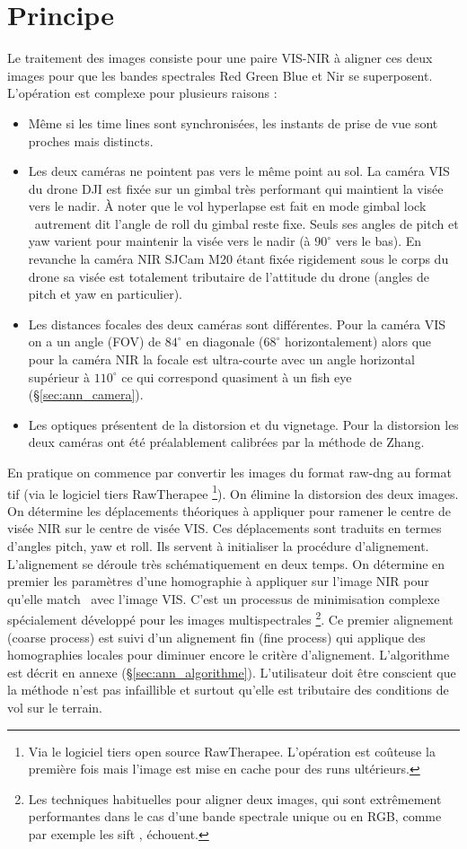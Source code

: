 \documentclass[a4paper,11pt]{report}
\begin{document}
\section{Principe}
Le traitement des images consiste pour une paire VIS-NIR à aligner ces deux images pour que les bandes spectrales Red Green Blue et Nir se superposent. L'opération est complexe pour plusieurs raisons :
\begin{itemize}
	\item Même si les time lines sont synchronisées, les instants de prise de vue sont proches mais distincts.
	\item Les deux caméras ne pointent pas vers le même point au sol. La caméra VIS du drone DJI est fixée sur un gimbal très performant qui maintient la visée vers le nadir. À noter que le vol hyperlapse est fait en mode \og gimbal lock \fg~autrement dit l'angle de roll du gimbal reste fixe. Seuls ses angles de pitch et yaw varient pour maintenir la visée vers le nadir (à $90^{\circ}$ vers le bas). En revanche la caméra NIR SJCam M20 étant fixée rigidement sous le corps du drone sa visée est totalement tributaire de l'attitude du drone (angles de pitch et yaw en particulier). 
	\item Les distances focales des deux caméras sont différentes. Pour la caméra VIS on a un angle (FOV) de $84^{\circ}$ en diagonale ($68^{\circ}$ horizontalement) alors que pour la caméra NIR la focale est ultra-courte avec un angle horizontal supérieur à $110^{\circ}$ ce qui correspond quasiment à un \og fish eye \fg{} (§\ref{sec:ann_camera}).
	\item Les optiques présentent de la distorsion et du vignetage. Pour la distorsion les deux caméras ont été préalablement calibrées par la méthode de Zhang.
\end{itemize} 



En pratique on commence par convertir les images du format raw-dng au format tif (via le logiciel tiers RawTherapee
\footnote{Via le logiciel tiers open source RawTherapee. L'opération est coûteuse la première fois mais l'image est mise en cache pour des runs ultérieurs.}).  On élimine la distorsion des deux images. On détermine les déplacements théoriques à appliquer pour ramener le centre de visée NIR sur le centre de visée VIS. Ces déplacements sont traduits en termes d'angles pitch, yaw et roll. Ils servent à initialiser la procédure d'alignement. L'alignement se déroule très schématiquement en deux temps. On détermine en premier les paramètres d'une homographie à appliquer sur l'image NIR pour qu'elle \og match \fg~avec l'image VIS. C'est un processus de minimisation complexe spécialement développé pour les images multispectrales 
	\footnote{Les techniques habituelles pour aligner deux images, qui sont extrêmement performantes dans le cas d'une bande spectrale unique ou en RGB, comme par exemple les \og sift \fg, échouent.}. 
Ce premier alignement (coarse process) est suivi d'un alignement fin (fine process) qui applique des homographies locales pour diminuer encore le critère d'alignement. L'algorithme est décrit en annexe (§\ref{sec:ann_algorithme}). L'utilisateur doit être conscient que la méthode n'est pas infaillible et surtout qu'elle est tributaire des conditions de vol sur le terrain. 
\end{document}
